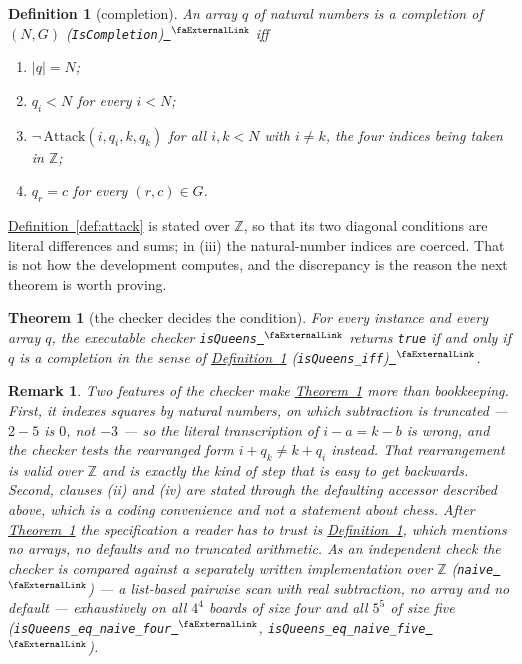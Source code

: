 \documentclass{easychair}
\newtheorem{theorem}[thm]{Theorem}
\newtheorem{remark}[thm]{Remark}
\newtheorem{definition}{Definition}[section]
\newcommand{\thmref}[1]{\textcolor{academicpurple}{\hyperref[#1]{Theorem~\ref*{#1}}}}
\newcommand{\defref}[1]{\textcolor{academicpurple}{\hyperref[#1]{Definition~\ref*{#1}}}}
\newcommand{\extlink}{~\ensuremath{{}^\text{\faExternalLink}}}
\newcommand{\repoowner}{mkaratarakis/HNBM}
\newcommand{\reporef}{1bd91612ee31180f6c99fa11090b713f3012ead4}
\newcommand{\repo}{https://github.com/\repoowner/blob/\reporef}
\newcommand{\srcl}[2]{\href{\repo/#1\#L#2}{\extlink}}
\newcommand{\qsrc}[2]{\srcl{HopfieldNet/QUBO/Instances/Queens/#1}{#2}}
\begin{document}
\begin{definition}[completion]\label{def:completion}
An array $q$ of natural numbers is a \emph{completion} of $(N,G)$
(\lstinline{IsCompletion})\qsrc{Spec.lean}{44} iff
\begin{enumerate}
\item[(i)]   $\lvert q\rvert = N$;
\item[(ii)]  $q_i < N$ for every $i < N$;
\item[(iii)] $\lnot\,\mathrm{Attack}(i, q_i, k, q_k)$ for all $i, k < N$ with $i \ne k$, the four
             indices being taken in $\mathbb{Z}$;
\item[(iv)]  $q_r = c$ for every $(r,c) \in G$.
\end{enumerate}
\end{definition}

\defref{def:attack} is stated over $\mathbb{Z}$, so that its two diagonal conditions are literal
differences and sums; in (iii) the natural-number indices are coerced. That is not how the
development computes, and the discrepancy is the reason the next theorem is worth proving.

\begin{theorem}[the checker decides the condition]\label{thm:spec}
For every instance and every array $q$, the executable checker
\lstinline{isQueens}\qsrc{Basic.lean}{613} returns \lstinline{true} if and only if $q$ is a completion
in the sense of \defref{def:completion} (\lstinline{isQueens_iff})\qsrc{Spec.lean}{57}.
\end{theorem}

\begin{remark}\label{rem:checker}
Two features of the checker make \thmref{thm:spec} more than bookkeeping. First, it indexes squares
by natural numbers, on which subtraction is truncated --- $2 - 5$ is $0$, not $-3$ --- so the
literal transcription of $i - a = k - b$ is wrong, and the checker tests the rearranged form
$i + q_k \ne k + q_i$ instead. That rearrangement is valid over $\mathbb{Z}$ and is exactly the kind
of step that is easy to get backwards. Second, clauses (ii) and (iv) are stated through the
defaulting accessor described above, which is a coding convenience and not a statement about chess.
After \thmref{thm:spec} the specification a reader has to trust is \defref{def:completion}, which
mentions no arrays, no defaults and no truncated arithmetic. As an independent check the checker is
compared against a separately written implementation over $\mathbb{Z}$
(\lstinline{naive}\qsrc{Spec.lean}{130}) --- a list-based pairwise scan with real subtraction, no array
and no default --- exhaustively on all $4^{4}$ boards of size four and all $5^{5}$ of size five
(\lstinline{isQueens_eq_naive_four}\qsrc{Spec.lean}{141},
\lstinline{isQueens_eq_naive_five}\qsrc{Spec.lean}{145}).
\end{remark}
\end{document}
